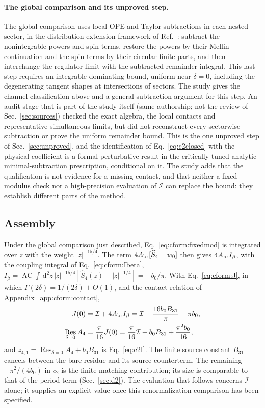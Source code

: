 \documentclass[11pt,a4paper]{article}
\numberwithin{equation}{section}
\newcommand{\dd}{\,\mathrm d}
\newcommand{\AC}{\operatorname{AC}}
\newcommand{\Res}{\operatorname*{Res}_{\delta=0}}
\newcommand{\cI}{\mathcal I}
\begin{document}
\paragraph{The global comparison and its unproved step.} The global comparison uses local OPE and Taylor subtractions
in each nested sector, in the distribution-extension framework of Ref.~\cite{Brunetti:2000}: subtract the
nonintegrable powers and spin terms, restore the powers by their Mellin continuation and the spin terms by their
circular finite parts, and then interchange the regulator limit with the subtracted remainder integral. This last
step requires an integrable dominating bound, uniform near $\delta=0$, including the degenerating tangent shapes at
intersections of sectors. The study gives the channel classification above and a general subtraction argument for
this step. An audit stage that is part of the study itself (same authorship; not the review of
Sec.~\ref{sec:sources}) checked the exact algebra, the local contacts and representative
simultaneous limits, but did not reconstruct every sectorwise subtraction or prove the uniform remainder bound. This
is the one unproved step of Sec.~\ref{sec:unproved}, and the identification of Eq.~\eqref{eq:c2closed} with the
physical coefficient is a formal perturbative result in the critically tuned analytic minimal-subtraction prescription,
conditional on it. The study adds that the qualification is not evidence for a missing contact, and that neither a
fixed-modulus check nor a high-precision evaluation of $\cI$ can replace the bound: they establish different parts of
the method.

\subsection{Assembly}\label{app:cform:assembly}
Under the global comparison just described, Eq.~\eqref{eq:cform:fixedmod} is integrated over $z$ with the weight
$|z|^{-15/4}$. The term $4A_{\rm br}[\widehat S_4-w_0]$ then gives $4A_{\rm br}I_\beta$, with the coupling integral of
Eq.~\eqref{eq:cform:Ibeta},
$I_\beta=\AC\!\int\dd^2z\,|z|^{-15/4}[\widehat S_4(z)-|z|^{-1/4}]=-b_0/\pi$. With Eq.~\eqref{eq:cform:J}, in which
$\Gamma(2\delta)=1/(2\delta)+O(1)$, and the contact relation of Appendix~\ref{app:cform:contact},
\begin{equation}
\begin{aligned}
 J(0)&=\cI+4A_{\rm br}I_\beta=\cI-\frac{16b_0B_{31}}{\pi}+\pi b_0,\\
 \Res A_4&=\frac\pi{16}J(0)=\frac\pi{16}\cI-b_0B_{31}+\frac{\pi^2b_0}{16},
\end{aligned}
\end{equation}
and $z_{4,1}=\Res A_4+b_0B_{31}$ is Eq.~\eqref{eq:c2I}. The finite source constant $B_{31}$ cancels between the bare
residue and its source counterterm. The remaining $-\pi^2/(4b_0)$ in $c_2$ is the finite matching contribution; its
size is comparable to that of the period term (Sec.~\ref{sec:d2}). The evaluation that follows concerns $\cI$ alone;
it supplies an explicit value once this renormalization comparison has been specified.
\end{document}
